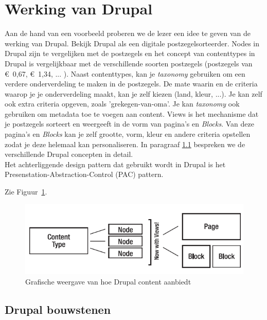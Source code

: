 \section{Werking van Drupal}

Aan de hand van een voorbeeld \cite{drupalDefGuide} proberen we de lezer een idee te geven van de werking van Drupal. Bekijk Drupal als een digitale postzegelsorteerder. Nodes in Drupal zijn te vergelijken met de postzegels en het concept van contenttypes in Drupal is vergelijkbaar met de verschillende soorten postzegels (postzegels van \euro~0,67, \euro~1,34, ... ). Naast contenttypes, kan je \textit{taxonomy} gebruiken om een verdere onderverdeling te maken in de postzegels. De mate waarin en de criteria waarop je je onderverdeling maakt, kan je zelf kiezen (land, kleur, ...). Je kan zelf ook extra criteria opgeven, zoals 'grekegen-van-oma'. Je kan \textit{taxonomy} ook gebruiken om metadata toe te voegen aan content. Views is het mechanisme dat je postzegels sorteert en weergeeft in de vorm van pagina's en \textit{Blocks}. Van deze pagina's en \textit{Blocks} kan je zelf grootte, vorm, kleur en andere criteria opstellen zodat je deze helemaal kan personaliseren. In paragraaf \ref{drupalBouwstenen} bespreken we de verschillende Drupal concepten in detail.\\

Het achterliggende design pattern dat gebruikt wordt in Drupal is het Presenstation-Abstraction-Control (PAC) pattern.



Zie Figuur~\ref{fig:drupalGrafischeWeergave}.

\begin{figure}[h]
\centering
\includegraphics{fig/drupalGrafischeWeergave}
\centering
\vspace{-10pt}
\caption{Grafische weergave van hoe Drupal content aanbiedt}
\vspace{-10pt}
\label{fig:drupalGrafischeWeergave}
\end{figure}

\subsection{Drupal bouwstenen}\label{drupalBouwstenen}

